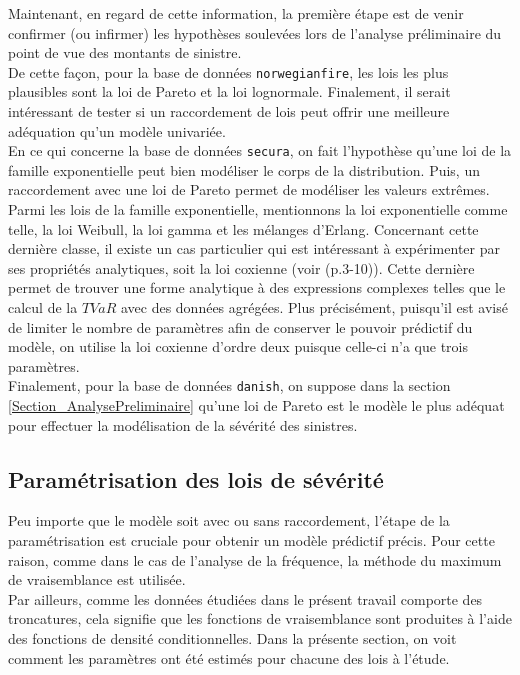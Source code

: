 	Maintenant, en regard de cette information, la première étape est de venir confirmer (ou infirmer) les hypothèses soulevées lors de l'analyse préliminaire du point de vue des montants de sinistre. \\
	
	De cette façon, pour la base de données \texttt{norwegianfire}, les lois les plus plausibles sont la loi de Pareto et la loi lognormale. Finalement, il serait intéressant de tester si un raccordement de lois peut offrir une meilleure adéquation qu'un modèle univariée.\\
	
	En ce qui concerne la base de données \texttt{secura}, on fait l'hypothèse qu'une loi de la famille exponentielle peut bien modéliser le corps de la distribution. Puis, un raccordement avec une loi de Pareto permet de modéliser les valeurs extrêmes. Parmi les lois de la famille exponentielle, mentionnons la loi exponentielle comme telle, la loi Weibull, la loi gamma et les mélanges d'Erlang. Concernant cette dernière classe, il existe un cas particulier qui est intéressant à expérimenter par ses propriétés analytiques, soit la loi coxienne (voir \cite{LossModels_FurtherTopics_Klugman2013}(p.3-10)). Cette dernière permet de trouver une forme analytique à des expressions complexes telles que le calcul de la $TVaR$ avec des données agrégées.
	Plus précisément, puisqu'il est avisé de limiter le nombre de paramètres afin de conserver le pouvoir prédictif du modèle, on utilise la loi coxienne d'ordre deux puisque celle-ci n'a que trois paramètres.\\
	
	Finalement, pour la base de données \texttt{danish}, on suppose dans la section \ref{Section_AnalysePreliminaire} qu'une loi de Pareto est le modèle le plus adéquat pour effectuer la modélisation de la sévérité des sinistres. \\
	
	\subsection{Paramétrisation des lois de sévérité}
	Peu importe que le modèle soit avec ou sans raccordement, l'étape de la paramétrisation est cruciale pour obtenir un modèle prédictif précis. Pour cette raison, comme dans le cas de l'analyse de la fréquence, la méthode du maximum de vraisemblance est utilisée.\\
	
	Par ailleurs, comme les données étudiées dans le présent travail comporte des troncatures, cela signifie que les fonctions de vraisemblance sont produites à l'aide des fonctions de densité conditionnelles. Dans la présente section, on voit comment les paramètres ont été estimés pour chacune des lois à l'étude.
